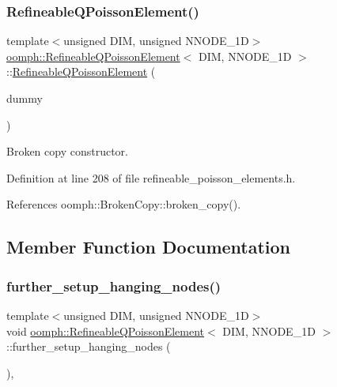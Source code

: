 \subsubsection{\texorpdfstring{Refineable\+Q\+Poisson\+Element()}{RefineableQPoissonElement()}\hspace{0.1cm}{\footnotesize\ttfamily [2/2]}}
{\footnotesize\ttfamily template$<$unsigned D\+IM, unsigned N\+N\+O\+D\+E\+\_\+1D$>$ \\
\hyperlink{classoomph_1_1RefineableQPoissonElement}{oomph\+::\+Refineable\+Q\+Poisson\+Element}$<$ D\+IM, N\+N\+O\+D\+E\+\_\+1D $>$\+::\hyperlink{classoomph_1_1RefineableQPoissonElement}{Refineable\+Q\+Poisson\+Element} (\begin{DoxyParamCaption}\item[{const \hyperlink{classoomph_1_1RefineableQPoissonElement}{Refineable\+Q\+Poisson\+Element}$<$ D\+IM, N\+N\+O\+D\+E\+\_\+1D $>$ \&}]{dummy }\end{DoxyParamCaption})\hspace{0.3cm}{\ttfamily [inline]}}



Broken copy constructor. 



Definition at line 208 of file refineable\+\_\+poisson\+\_\+elements.\+h.



References oomph\+::\+Broken\+Copy\+::broken\+\_\+copy().



\subsection{Member Function Documentation}
\mbox{\label{classoomph_1_1RefineableQPoissonElement_afe7fd0310ac9f03550ea83239cd57d40}} 
\subsubsection{\texorpdfstring{further\+\_\+setup\+\_\+hanging\+\_\+nodes()}{further\_setup\_hanging\_nodes()}}
{\footnotesize\ttfamily template$<$unsigned D\+IM, unsigned N\+N\+O\+D\+E\+\_\+1D$>$ \\
void \hyperlink{classoomph_1_1RefineableQPoissonElement}{oomph\+::\+Refineable\+Q\+Poisson\+Element}$<$ D\+IM, N\+N\+O\+D\+E\+\_\+1D $>$\+::further\+\_\+setup\+\_\+hanging\+\_\+nodes (\begin{DoxyParamCaption}{ }\end{DoxyParamCaption})\hspace{0.3cm}{\ttfamily [inline]}, {\ttfamily [virtual]}}



